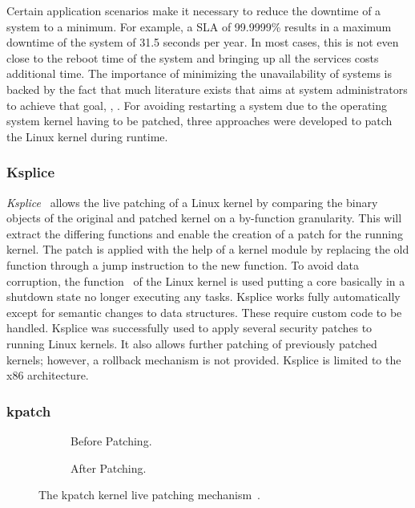 Certain application scenarios make it necessary to reduce the downtime of a system to a minimum. For example, a \ac{SLA} of 99.9999\% results in a maximum downtime of the system of 31.5 seconds per year. In most cases, this is not even close to the reboot time of the system and bringing up all the services costs additional time. The importance of minimizing the unavailability of systems is backed by the fact that much literature exists that aims at system administrators to achieve that goal, \eg, \textcite{Binnie-2016-ZeroDownTime}. For avoiding restarting a system due to the operating system kernel having to be patched, three approaches were developed to patch the Linux kernel during runtime.

\subsubsection{Ksplice}

\emph{Ksplice}~\cite{Arnold-2009ksplice} allows the live patching of a Linux kernel by comparing the binary objects of the original and patched kernel on a by-function granularity. This will extract the differing functions and enable the creation of a patch for the running kernel. The patch is applied with the help of a kernel module by replacing the old function through a jump instruction to the new function. To avoid data corruption, the  function~\cite[]{Linux44} of the Linux kernel is used putting a core basically in a shutdown state no longer executing any tasks. Ksplice works fully automatically except for semantic changes to data structures. These require custom code to be handled. Ksplice was successfully used to apply several security patches to running Linux kernels. It also allows further patching of previously patched kernels; however, a rollback mechanism is not provided. Ksplice is limited to the x86 architecture.

\subsubsection{kpatch}

\begin{figure}[t!]\centering
	\begin{subfigure}[b]{0.3\textwidth}\centering
		\vspace{0.75cm}
		\caption{Before Patching.}%
		\label{fig:related:kpatch1}
	\end{subfigure} \hfill
	\begin{subfigure}[b]{0.6\textwidth}\centering
		\caption{After Patching.}%
		\label{fig:related:kpatch2}
	\end{subfigure}
	\caption[The kpatch kernel live patching mechanism.]{The kpatch kernel live patching mechanism~\cite{Jennings-2014-kpatch}.}%
	\label{fig:related:kpatch}
\end{figure}


